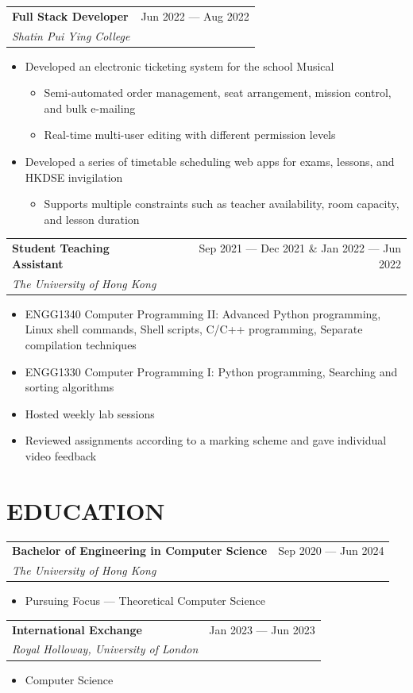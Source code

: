 \documentclass{article}
\newcommand{\jobTitle}[3]{
\vspace{0.4cm}
\begin{tabularx}{0.99\linewidth}{ X r }
    \textbf{#1} & #2\\
    \textit{#3} &
\end{tabularx}
\vspace{0.2cm}
}
\newenvironment{descitemize}
{ \begin{itemize}[leftmargin=1.4cm,,topsep=0pt]
    \setlength{\parskip}{0pt}
    \setlength{\parsep}{0pt}     }
{ \end{itemize}                  }
\begin{document}
\jobTitle
{Full Stack Developer}
{Jun 2022 --- Aug 2022}
{Shatin Pui Ying College}
\begin{descitemize}
    \item Developed an electronic ticketing system for the school Musical
    \begin{itemize}
        \item Semi-automated order management, seat arrangement, mission control, and bulk e-mailing
        \item Real-time multi-user editing with different permission levels
    \end{itemize}
    \item Developed a series of timetable scheduling web apps for exams, lessons, and HKDSE invigilation
    \begin{itemize}
        \item Supports multiple constraints such as teacher availability, room capacity, and lesson duration
    \end{itemize}
\end{descitemize}

\jobTitle
{Student Teaching Assistant}
{Sep 2021 --- Dec 2021 \& Jan 2022 --- Jun 2022}
{The University of Hong Kong}
\begin{descitemize}
    \item ENGG1340 Computer Programming II: Advanced Python programming, Linux shell commands, Shell scripts, C/C++ programming, Separate compilation techniques
    \item ENGG1330 Computer Programming I: Python programming, Searching and sorting algorithms
    \item Hosted weekly lab sessions
    \item Reviewed assignments according to a marking scheme and gave individual video feedback
\end{descitemize}

\section{EDUCATION}

\jobTitle
{Bachelor of Engineering in Computer Science}
{Sep 2020 --- Jun 2024}
{The University of Hong Kong}
\begin{descitemize}
    \item Pursuing Focus --- Theoretical Computer Science
\end{descitemize}

\jobTitle
{International Exchange}
{Jan 2023 --- Jun 2023}
{Royal Holloway, University of London}
\begin{descitemize}
    \item Computer Science
\end{descitemize}
\end{document}
